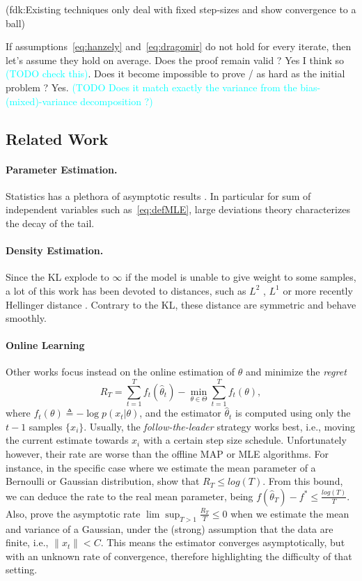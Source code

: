 \documentclass[twoside]{article}
\newcommand{\fdk}[1]{\textcolor{Periwinkle}{(fdk:#1)}}
\newcommand{\TODO}[1]{\textcolor{cyan}{(TODO #1)}}
\begin{document}
\fdk{Existing techniques only deal with fixed step-sizes and show convergence to a ball}

If assumptions~\eqref{eq:hanzely} and~\eqref{eq:dragomir} do not hold for every iterate, then let's assume they hold on average. Does the proof remain valid ? Yes I think so \TODO{check this}. Does it become impossible to prove / as hard as the initial problem ? Yes.
\TODO{Does it match exactly the variance from the bias-(mixed)-variance decomposition ?}

\subsection{Related Work}

\paragraph{Parameter Estimation.}
Statistics has a plethora of asymptotic results \citep{vdv1998asymptotic}.
In particular for sum of independent variables such as~\eqref{eq:defMLE}, large deviations theory \citep{varadhan1984large} characterizes the decay of the tail.

\paragraph{Density Estimation.}
Since the KL explode to $\infty$ if the model is unable to give weight to some samples, a lot of this work has been devoted to distances, such as $L^2$ \citep{tsybakov2009introduction}, $L^1$ \citep{devroye2001combinatorial} or more recently Hellinger distance \citep{baraud2017new}.
Contrary to the KL, these distance are symmetric and behave smoothly.

\paragraph{Online Learning}
Other works focus instead on the online estimation of $\theta$ and minimize the \textit{regret}
\[
R_T=\sum_{t=1}^T f_t(\hat{\theta}_t)-\min_{\theta\in\Theta}\sum_{t=1}^Tf_t(\theta),
\]
where $f_t(\theta)\triangleq-\log p(x_t|\theta)$, and the estimator $\hat{\theta}_t$ is computed using only the $t-1$ samples $\{x_i\}$. Usually, the \textit{follow-the-leader} strategy works best, i.e., moving the current estimate towards $x_i$ with a certain step size schedule. Unfortunately however, their rate are worse than the offline MAP or MLE algorithms. For instance, in the specific case where we estimate the mean parameter of a Bernoulli or Gaussian distribution, \citet{azoury2001relative} show that $R_T\leq log(T)$. From this bound, we can deduce the rate  to the real mean parameter, being $f(\hat{\theta}_T)-f^*\leq \frac{log(T)}{T}$. Also, \citet{dasgupta2007online} prove the asymptotic rate $\lim\sup_{T>1}\frac{R_T}{T}\leq 0$ when we estimate the mean and variance of a Gaussian, under the (strong) assumption that the data are finite, i.e., $\|x_t\|<C$. This means the estimator converges asymptotically, but with an unknown rate of convergence, therefore highlighting the difficulty of that setting.
\end{document}
